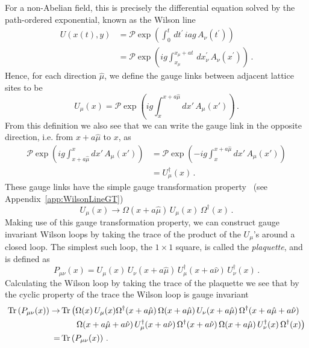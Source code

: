 For a non-Abelian field, this is precisely the differential equation solved by the path-ordered exponential, known as the Wilson line
%
\begin{align*}
U(x(t),y) &= \mathcal{P}\exp\left(\int_0^t \,dt^\prime\, iag \,A_\nu(t^\prime)\right)\\
&=\mathcal{P}\exp\left(ig\int_{x_\mu}^{x_\mu+at}\,dx_\nu^\prime\, A_\nu(x^\prime)\right)\, .
\end{align*}
%
Hence, for each direction $\hat{\mu}$, we define the gauge links between adjacent lattice sites to be
\begin{equation}
U_\mu(x) = \mathcal{P}\exp\left(ig\int_x^{x+a\hat{\mu}}dx'\,A_\mu(x')\right)\, .
\label{eq:GaugeLink}
\end{equation}
From this definition we also see that we can write the gauge link in the opposite direction, i.e. from $x+a\hat{\mu}$ to $x$, as
\begin{align*}
\mathcal{P}\exp\left(ig\int^x_{x+a\hat{\mu}}dx'\,A_\mu(x')\right) &= \mathcal{P}\exp\left(-ig\int_x^{x+a\hat{\mu}}dx'\,A_\mu(x')\right)\\
&=U^\dag_\mu(x)\, .
\end{align*}
These gauge links have the simple gauge transformation property~\cite{Lepage:1998dt} (see Appendix~\ref{app:WilsonLineGT})
%
\begin{equation}
U_\mu(x)\rightarrow \Omega(x+a\hat{\mu})\,U_\mu(x)\,\Omega^\dag(x)\, .
\label{eq:LinkTransformation}
\end{equation}
%
Making use of this gauge transformation property, we can construct gauge invariant Wilson loops by taking the trace of the product of the $U_\mu$'s around a closed loop. The simplest such loop, the $1\times 1$ square, is called the \textit{plaquette}, and is defined as
\begin{equation}
P_{\mu\nu}(x) = U_\mu(x)\,U_\nu(x+a\hat{\mu})\, U_\mu^\dag(x+a\hat{\nu})\, U_\nu^\dag(x)\, .
\label{eq:Plaquette}
\end{equation}
Calculating the Wilson loop by taking the trace of the plaquette we see that by the cyclic property of the trace the Wilson loop is gauge invariant
\begin{align*}
\operatorname{Tr}\left(P_{\mu\nu}(x)\right)\rightarrow& \operatorname{Tr} \left(\Omega(x)\,U_\mu(x)\Omega^\dag(x+a\hat{\mu})\,\Omega(x+a\hat{\mu})\,U_\nu(x+a\hat{\mu})\,\Omega^\dag(x+a\hat{\mu}+a\hat{\nu})\right.\\
&~~~~~\left.\Omega(x+a\hat{\mu}+a\hat{\nu})\,U_\mu^\dag(x+a\hat{\nu})\,\Omega^\dag(x+a\hat{\nu})\,\Omega(x+a\hat{\mu})\, U_\nu^\dag(x)\,\Omega^\dag(x)\right)\\
=&\operatorname{Tr}\left(P_{\mu\nu}(x)\right)\, .
\end{align*}\\


